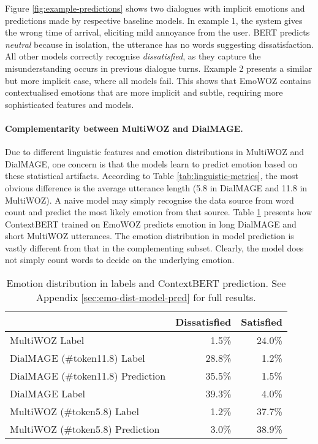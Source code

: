 \documentclass[10pt, a4paper]{article}
\begin{document}
Figure \ref{fig:example-predictions} shows two dialogues with implicit emotions and predictions made by respective baseline models. In example 1, the system gives the wrong time of arrival, eliciting mild annoyance from the user. BERT predicts \textit{neutral} because in isolation, the utterance has no words suggesting dissatisfaction. All other models correctly recognise \textit{dissatisfied}, as they capture the misunderstanding occurs in previous dialogue turns. Example 2 presents a similar but more implicit case, where all models fail. This shows that EmoWOZ contains contextualised emotions that are more implicit and subtle, requiring more sophisticated features and models.

\paragraph{Complementarity between MultiWOZ and DialMAGE.} 
Due to different linguistic features and emotion distributions in MultiWOZ and DialMAGE, one concern is that the models learn to predict emotion based on these statistical artifacts. According to Table \ref{tab:linguistic-metrics}, the most obvious difference is the average utterance length (5.8 in DialMAGE and 11.8 in MultiWOZ). A naive model may simply recognise the data source from word count and predict the most likely emotion from that source. Table \ref{tab:artifact} presents how ContextBERT trained on EmoWOZ predicts emotion in long DialMAGE and short MultiWOZ utterances. The emotion distribution in model prediction is vastly different from that in the complementing subset. Clearly, the model does not simply count words to decide on the underlying emotion.

\begin{table}[ht]
\centering
\scriptsize
\begin{tabular}{l|rr}
\toprule[1pt]
    & \textbf{Dissatisfied} & \textbf{Satisfied} \\ \hline
MultiWOZ Label          & 1.5\%       & 24.0\%   \\
DialMAGE (\#token11.8) Label                   & 28.8\%      & 1.2\%    \\
DialMAGE (\#token11.8) Prediction  & 35.5\%      & 1.5\%    \\ \hline
DialMAGE Label           & 39.3\%      & 4.0\%    \\ 
MultiWOZ (\#token5.8) Label                  & 1.2\%       & 37.7\%   \\
MultiWOZ (\#token5.8) Prediction & 3.0\%       & 38.9\%   \\
\bottomrule[1pt]
\end{tabular}
\caption{Emotion distribution in labels and ContextBERT prediction. See Appendix \ref{sec:emo-dist-model-pred} for full results. 
\label{tab:artifact}}
\vspace*{-3mm}
\end{table}
\end{document}
